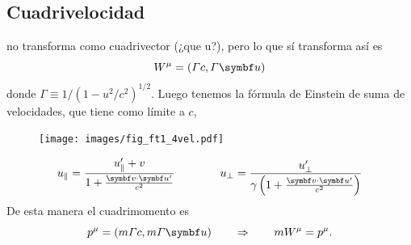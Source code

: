 \documentclass[10pt,oneside]{CBFT_book}
\begin{document}
\subsection{Cuadrivelocidad}

 no transforma como cuadrivector (¿que u?), pero lo que sí transforma así es
\[
	W^\mu = ( \Gamma c , \Gamma \vb{u} ) 
\]
donde $ \Gamma \equiv 1/( 1 - u^2/c^2)^{1/2}$. Luego tenemos la fórmula de Einstein de suma de velocidades,
que tiene como límite a $c$,

\begin{figure}[htb]
	\begin{center}
	\texttt{[image: images/fig\_ft1\_4vel.pdf]}	 
	\end{center}
	\caption{}
\end{figure} 

\[
	u_\parallel = \frac{ u'_\parallel + v}{ 1 + \frac{\pe{v}{u'}}{c^2} } \qquad \qquad 
	u_\perp = \frac{ u'_\perp}{\gamma\left(1 + \frac{\pe{v}{u'}}{c^2}\right)}
\]
De esta manera el cuadrimomento es 
\[
	p^\mu = ( m\Gamma c, m \Gamma \vb{u}) \qquad \Rightarrow \qquad m W^\mu = p^\mu.
\]
\end{document}
